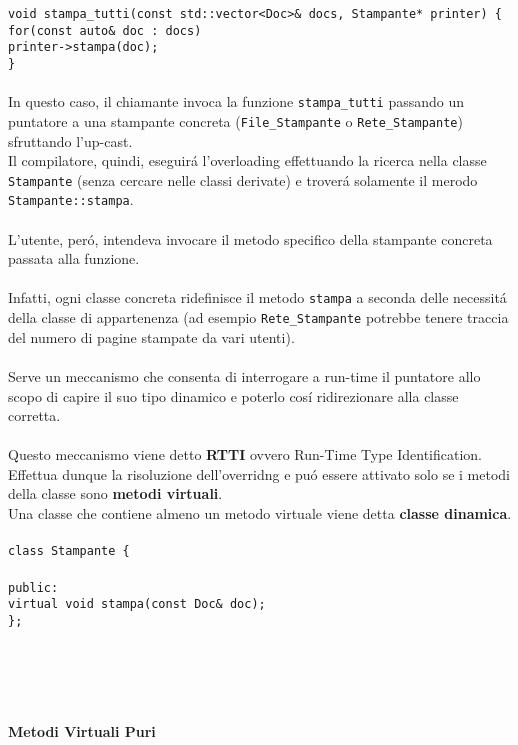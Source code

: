 \documentclass{article}
\newcommand\tab[1][1cm]{\hspace*{#1}}
\begin{document}
\texttt{void stampa\_tutti(const std::vector<Doc>\& docs, Stampante* printer) \{ \\  \tab for(const auto\& doc : docs) \\ \tab \tab printer->stampa(doc); \\ \} } \\ \\ 
In questo caso, il chiamante invoca la funzione \texttt{stampa\_tutti} passando un puntatore a una stampante concreta (\texttt{File\_Stampante} o \texttt{Rete\_Stampante}) sfruttando l'up-cast.\\ Il compilatore, quindi, eseguir\'a l'overloading effettuando la ricerca nella classe \texttt{Stampante} (senza cercare nelle classi derivate) e trover\'a solamente il merodo \texttt{Stampante::stampa}. \\ \\ L'utente, per\'o, intendeva invocare il metodo specifico della stampante concreta passata alla funzione.\\ \\Infatti, ogni classe concreta ridefinisce il metodo \texttt{stampa} a seconda delle necessit\'a della classe di appartenenza (ad esempio \texttt{Rete\_Stampante} potrebbe tenere traccia del numero di pagine stampate da vari utenti).\\ \\Serve un meccanismo che consenta di interrogare a run-time il puntatore allo scopo di capire il suo tipo dinamico e poterlo cos\'i ridirezionare alla classe corretta.\\ \\Questo meccanismo viene detto \textbf{RTTI} ovvero Run-Time Type Identification. \\Effettua dunque la risoluzione dell'overridng e pu\'o essere attivato solo se i metodi della classe sono \textbf{metodi virtuali}.\\ Una classe che contiene almeno un metodo virtuale viene detta \textbf{classe dinamica}.\\ \\
\texttt{class Stampante \{ \\ \\ \tab public: \\ \tab \tab virtual void stampa(const Doc\& doc); \\ \};}
\\ \\ \\ \\ \\
\begin{large}\textbf{\textcolor{blu}{Metodi Virtuali Puri}} \\ \\ \end{large}
\end{document}
